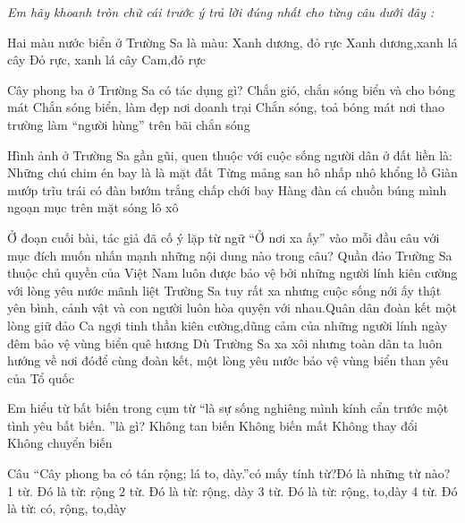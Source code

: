 {\textit{Em hãy khoanh tròn chữ cái trước ý trả lời đúng nhất cho từng câu dưới đây :}}
\tatloigiaiex
\begin{ex}
	Hai màu nước biển ở Trường Sa là màu:
	\choice
	{Xanh dương, đỏ rực}
	{Xanh dương,xanh lá cây}
	{Đỏ rực, xanh lá cây}
	{Cam,đỏ rực}
	\loigiai{}
\end{ex}
\begin{ex}
	Cây phong ba ở Trường Sa có tác dụng gì?
	\choice
	{Chắn gió, chắn sóng biển và cho bóng mát}
	{Chắn sóng biển, làm đẹp nơi doanh trại}
	{Chắn sóng, toả bóng mát nơi thao trường}
	{làm “người hùng” trên bãi chắn sóng}
	\loigiai{}
\end{ex}
\begin{ex}
	Hình ảnh ở Trường Sa gần gũi, quen thuộc với cuộc sống người dân ở đất liền là:
	\choice
	{Những chú chim én bay là là mặt đất}
	{Từng mảng san hô nhấp nhô khổng lồ}
	{Giàn mướp trĩu trái có đàn bướm trắng chấp chới bay}
	{Hàng đàn cá chuồn búng mình ngoạn mục trên mặt sóng lô xô}
	\loigiai{}
\end{ex}
\begin{ex}
	Ở đoạn cuối bài, tác giả đã cố ý lặp từ ngữ “Ở nơi xa ấy” vào mỗi đầu câu với mục đích muốn nhấn mạnh những nội dung nào trong câu?
	\choice
	{Quần đảo Trường Sa thuộc chủ quyền của Việt Nam luôn được bảo vệ bởi những người lính kiên cường với lòng yêu nước mãnh liệt}
	{Trường Sa tuy rất xa nhưng cuộc sống nới ấy thật yên bình, cảnh vật và con người luôn hòa quyện với nhau.Quân dân đoàn kết một lòng giữ đảo}
	{Ca ngợi tinh thần kiên cường,dũng cảm của những người lính ngày đêm bảo vệ vùng biển quê hương}
	{Dù Trường Sa xa xôi nhưng toàn dân ta luôn hướng về nơi đóđể cùng đoàn kết, một lòng yêu nước bảo vệ vùng biển than yêu của Tổ quốc}
	\loigiai{}
\end{ex}
\begin{ex}
	Em hiểu từ bất biến trong cụm từ “là sự sống nghiêng mình kính cẩn trước một tình yêu bất biến. ”là gì?
	\choice
	{Không tan biến}
	{Không biến mất}
	{Không thay đổi}
	{Không chuyển biến}
	\loigiai{}
\end{ex}
\begin{ex}
	Câu “Cây phong ba có tán rộng; lá to, dày.”có mấy tính từ?Đó là những từ nào?
	\choice
	{1 từ. Đó là từ: rộng}
	{2 từ. Đó là từ: rộng, dày}
	{3 từ. Đó là từ: rộng, to,dày}
	{4 từ. Đó là từ: có, rộng, to,dày}
	\loigiai{}
\end{ex}
